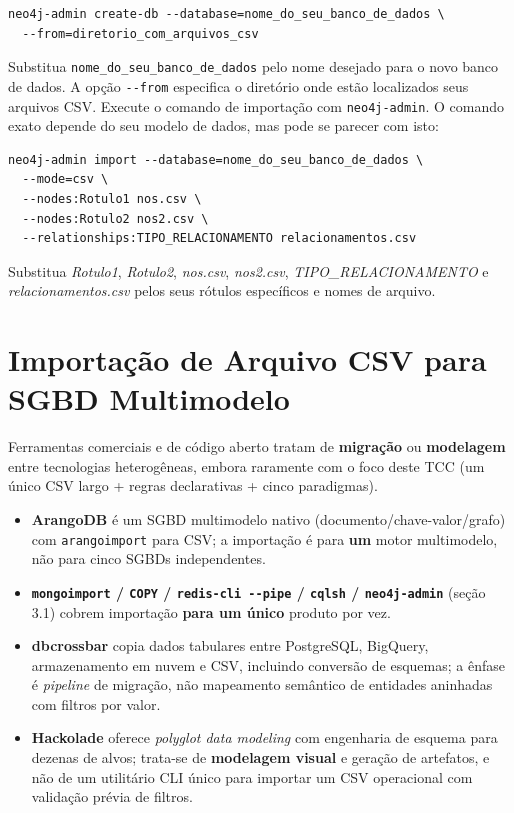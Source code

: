 \begin{lstlisting}[style=bashstyle]
neo4j-admin create-db --database=nome_do_seu_banco_de_dados \
  --from=diretorio_com_arquivos_csv
\end{lstlisting}

Substitua \texttt{nome\_do\_seu\_banco\_de\_dados} pelo nome desejado para o novo banco de
dados. A opção \texttt{-{}-from} especifica o diretório onde estão localizados seus
arquivos CSV. Execute o comando de importação com \texttt{neo4j-admin}. O comando exato
depende do seu modelo de dados, mas pode se parecer com isto:

\begin{lstlisting}[style=bashstyle]
neo4j-admin import --database=nome_do_seu_banco_de_dados \
  --mode=csv \
  --nodes:Rotulo1 nos.csv \
  --nodes:Rotulo2 nos2.csv \
  --relationships:TIPO_RELACIONAMENTO relacionamentos.csv
\end{lstlisting}

Substitua \textit{Rotulo1}, \textit{Rotulo2}, \textit{nos.csv}, \textit{nos2.csv},
\textit{TIPO\_RELACIONAMENTO} e \textit{relacionamentos.csv} pelos seus rótulos específicos
e nomes de arquivo.

\section{Importação de Arquivo CSV para SGBD Multimodelo}

Ferramentas comerciais e de código aberto tratam de \textbf{migração} ou
\textbf{modelagem} entre tecnologias heterogêneas, embora raramente com o foco deste TCC
(um único CSV largo + regras declarativas + cinco paradigmas).

\begin{itemize}
  \item \textbf{ArangoDB} é um SGBD multimodelo nativo (documento/chave-valor/grafo) com
        \texttt{arangoimport} para CSV; a importação é para \textbf{um} motor multimodelo,
        não para cinco SGBDs independentes.

  \item \textbf{\texttt{mongoimport} / \texttt{COPY} / \texttt{redis-cli -\/-pipe} /
        \texttt{cqlsh} / \texttt{neo4j-admin}} (seção 3.1) cobrem importação \textbf{para
        um único} produto por vez.

  \item \textbf{dbcrossbar} \cite{dbcrossbar2024} copia dados tabulares entre PostgreSQL,
        BigQuery, armazenamento em nuvem e CSV, incluindo conversão de esquemas; a ênfase é
        \textit{pipeline} de migração, não mapeamento semântico de entidades aninhadas com
        filtros por valor.

  \item \textbf{Hackolade} \cite{hackolade2024polyglot} oferece \textit{polyglot data
        modeling} com engenharia de esquema para dezenas de alvos; trata-se de
        \textbf{modelagem visual} e geração de artefatos, e não de um utilitário CLI único
        para importar um CSV operacional com validação prévia de filtros.
\end{itemize}

